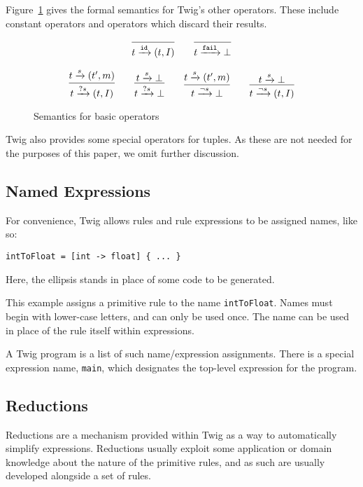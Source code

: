 Figure~\ref{semantics:basic} gives the formal semantics for Twig's other
operators. These include constant operators and operators which discard their
results.

\begin{figure}[ht]
\label{semantics:basic}
\[
\infer{t \arr{\mathtt{id}} (t,I)}{}
\qquad
\infer{t \arr{\mathtt{fail}} \bot}{}
\]

\[
\infer{t \arr{?s} (t,I)}{t \arr{s} (t',m)}
\qquad 
\infer{t \arr{?s} \bot}{t \arr{s} \bot}
\qquad
\infer{t \arr{\lnot s} \bot}{t \arr{s} (t',m)}
\qquad 
\infer{t \arr{\lnot s} (t,I)}{t \arr{s} \bot}
\]
\caption{Semantics for basic operators}
\end{figure}

Twig also provides some special operators for tuples. As these are not needed
for the purposes of this paper, we omit further discussion.

\subsection{Named Expressions}
\label{section:names}

For convenience, Twig allows rules and rule expressions to be assigned names,
like so:

\begin{verbatim}
intToFloat = [int -> float] { ... }
\end{verbatim}

Here, the ellipsis stands in place of some code to be generated.

This example assigns a primitive rule to the name \texttt{intToFloat}. Names
must begin with lower-case letters, and can only be used once. The name can be
used in place of the rule itself within expressions.

A Twig program is a list of such name/expression assignments. There is a special
expression name, \texttt{main}, which designates the top-level expression for
the program.

\subsection{Reductions}
\label{sec:reductions}

Reductions are a mechanism provided within Twig as a way to automatically
simplify expressions. Reductions usually exploit some application or domain
knowledge about the nature of the primitive rules, and as such are usually
developed alongside a set of rules.


